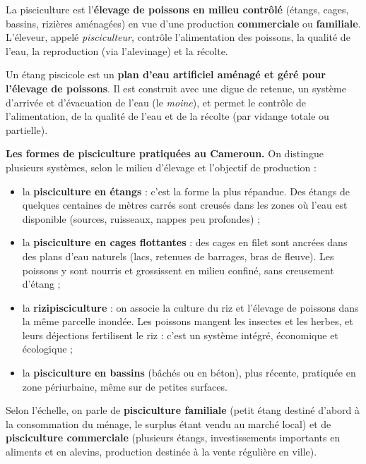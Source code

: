 \documentclass[11pt]{article}
\newcommand{\cle}[1]{{\popxbold\color{popdark}#1}}
\begin{document}
\begin{definition}[La pisciculture]
La \cle{pisciculture} est l'\textbf{élevage de poissons en milieu contrôlé} (étangs, cages, bassins, rizières aménagées) en vue d'une production \textbf{commerciale} ou \textbf{familiale}. L'éleveur, appelé \emph{pisciculteur}, contrôle l'alimentation des poissons, la qualité de l'eau, la reproduction (via l'alevinage) et la récolte.
\end{definition}

\begin{definition}
Un \cle{étang} piscicole est un \textbf{plan d'eau artificiel aménagé et géré pour l'élevage de poissons}. Il est construit avec une digue de retenue, un système d'arrivée et d'évacuation de l'eau (le \emph{moine}), et permet le contrôle de l'alimentation, de la qualité de l'eau et de la récolte (par vidange totale ou partielle).
\end{definition}

\textbf{Les formes de pisciculture pratiquées au Cameroun.} On distingue plusieurs systèmes, selon le milieu d'élevage et l'objectif de production :

\begin{itemize}
\item la \textbf{pisciculture en étangs} : c'est la forme la plus répandue. Des étangs de quelques centaines de mètres carrés sont creusés dans les zones où l'eau est disponible (sources, ruisseaux, nappes peu profondes) ;
\item la \textbf{pisciculture en cages flottantes} : des cages en filet sont ancrées dans des plans d'eau naturels (lacs, retenues de barrages, bras de fleuve). Les poissons y sont nourris et grossissent en milieu confiné, sans creusement d'étang ;
\item la \textbf{rizipisciculture} : on associe la culture du riz et l'élevage de poissons dans la même parcelle inondée. Les poissons mangent les insectes et les herbes, et leurs déjections fertilisent le riz : c'est un système intégré, économique et écologique ;
\item la \textbf{pisciculture en bassins} (bâchés ou en béton), plus récente, pratiquée en zone périurbaine, même sur de petites surfaces.
\end{itemize}

Selon l'échelle, on parle de \textbf{pisciculture familiale} (petit étang destiné d'abord à la consommation du ménage, le surplus étant vendu au marché local) et de \textbf{pisciculture commerciale} (plusieurs étangs, investissements importants en aliments et en alevins, production destinée à la vente régulière en ville).
\end{document}
